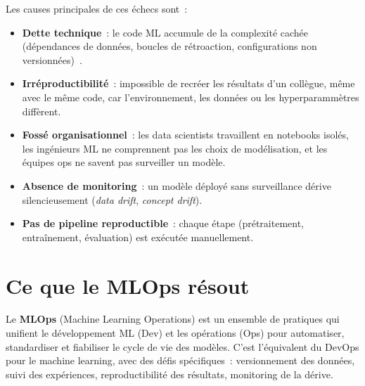 Les causes principales de ces \'echecs sont~:
\begin{itemize}
  \item \textbf{Dette technique}~: le code ML accumule
    de la complexit\'e cach\'ee (d\'ependances de donn\'ees, boucles de
    r\'etroaction, configurations non versionn\'ees)~\cite{sculley2015}.
  \item \textbf{Irr\'eproductibilit\'e}~: impossible de recr\'eer les r\'esultats
    d'un coll\`egue, m\^eme avec le m\^eme code, car l'environnement, les donn\'ees
    ou les hyperparamm\`etres diff\`erent.
  \item \textbf{Foss\'e organisationnel}~: les data scientists travaillent en
    notebooks isol\'es, les ing\'enieurs ML ne comprennent pas les choix de
    mod\'elisation, et les \'equipes ops ne savent pas surveiller un mod\`ele.
  \item \textbf{Absence de monitoring}~: un mod\`ele d\'eploy\'e sans surveillance
    d\'erive silencieusement (\emph{data drift}, \emph{concept drift}).
  \item \textbf{Pas de pipeline reproductible}~: chaque \'etape (pr\'etraitement,
    entra\^inement, \'evaluation) est ex\'ecut\'ee manuellement.
\end{itemize}

\section*{Ce que le MLOps r\'esout}

Le \textbf{MLOps} (Machine Learning Operations) est un ensemble
de pratiques qui unifient le d\'eveloppement ML (Dev) et les op\'erations (Ops)
pour automatiser, standardiser et fiabiliser le cycle de vie des mod\`eles.
C'est l'\'equivalent du DevOps pour le machine learning, avec des d\'efis
sp\'ecifiques~: versionnement des donn\'ees, suivi des exp\'eriences,
reproductibilit\'e des r\'esultats, monitoring de la d\'erive.

\begin{center}
\end{center}

